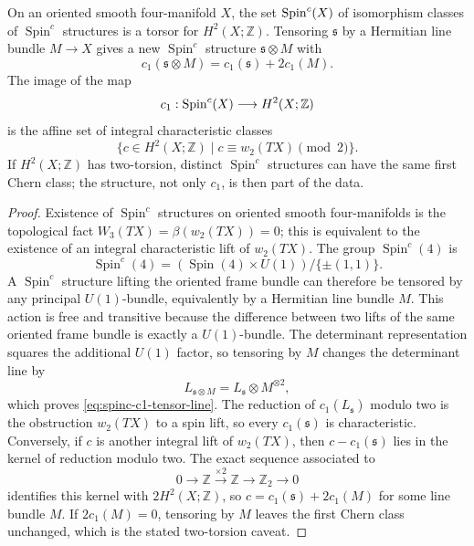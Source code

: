 \begin{proposition}
\label{prop:spinc-characteristic-lifts}
On an oriented smooth four-manifold \(X\), the set
\({\rm Spin}^c(X)\) of isomorphism classes of
\(\operatorname{Spin}^c\) structures is a torsor for \(H^2(X;\mathbb Z)\).
Tensoring \(\mathfrak s\) by a Hermitian line bundle \(M\to X\) gives a new
\(\operatorname{Spin}^c\) structure \(\mathfrak s\otimes M\) with
\begin{equation}
  c_1(\mathfrak s\otimes M)
  =
  c_1(\mathfrak s)+2c_1(M).
  \label{eq:spinc-c1-tensor-line}
\end{equation}
The image of the map
\[
  c_1:{\rm Spin}^c(X)\longrightarrow H^2(X;\mathbb Z)
\]
is the affine set of integral characteristic classes
\begin{equation}
  \{c\in H^2(X;\mathbb Z)\mid c\equiv w_2(TX)\pmod2\}.
  \label{eq:spinc-characteristic-image}
\end{equation}
If \(H^2(X;\mathbb Z)\) has two-torsion, distinct
\(\operatorname{Spin}^c\) structures can have the same first Chern class;
the structure, not only \(c_1\), is then part of the data.
\end{proposition}

\begin{proof}
Existence of \(\operatorname{Spin}^c\) structures on oriented smooth
four-manifolds is the topological fact \(W_3(TX)=\beta(w_2(TX))=0\); this is
equivalent to the existence of an integral characteristic lift of \(w_2(TX)\).
The group \(\operatorname{Spin}^c(4)\) is
\[
  \operatorname{Spin}^c(4)
  =
  (\operatorname{Spin}(4)\times U(1))/\{\pm(1,1)\}.
\]
A \(\operatorname{Spin}^c\) structure lifting the oriented frame bundle can
therefore be tensored by any principal \(U(1)\)-bundle, equivalently by a
Hermitian line bundle \(M\).  This action is free and transitive because the
difference between two lifts of the same oriented frame bundle is exactly a
\(U(1)\)-bundle.  The determinant representation squares the additional
\(U(1)\) factor, so tensoring by \(M\) changes the determinant line by
\[
  L_{\mathfrak s\otimes M}
  =
  L_{\mathfrak s}\otimes M^{\otimes2},
\]
which proves \eqref{eq:spinc-c1-tensor-line}.  The reduction of
\(c_1(L_{\mathfrak s})\) modulo two is the obstruction \(w_2(TX)\) to a
spin lift, so every \(c_1(\mathfrak s)\) is characteristic.  Conversely, if
\(c\) is another integral lift of \(w_2(TX)\), then
\(c-c_1(\mathfrak s)\) lies in the kernel of reduction modulo two.  The
exact sequence associated to
\[
  0\longrightarrow \mathbb Z
  \xrightarrow{\times2}
  \mathbb Z
  \longrightarrow \mathbb Z_2
  \longrightarrow0
\]
identifies this kernel with \(2H^2(X;\mathbb Z)\), so
\(c=c_1(\mathfrak s)+2c_1(M)\) for some line bundle \(M\).  If
\(2c_1(M)=0\), tensoring by \(M\) leaves the first Chern class unchanged,
which is the stated two-torsion caveat.
\end{proof}

